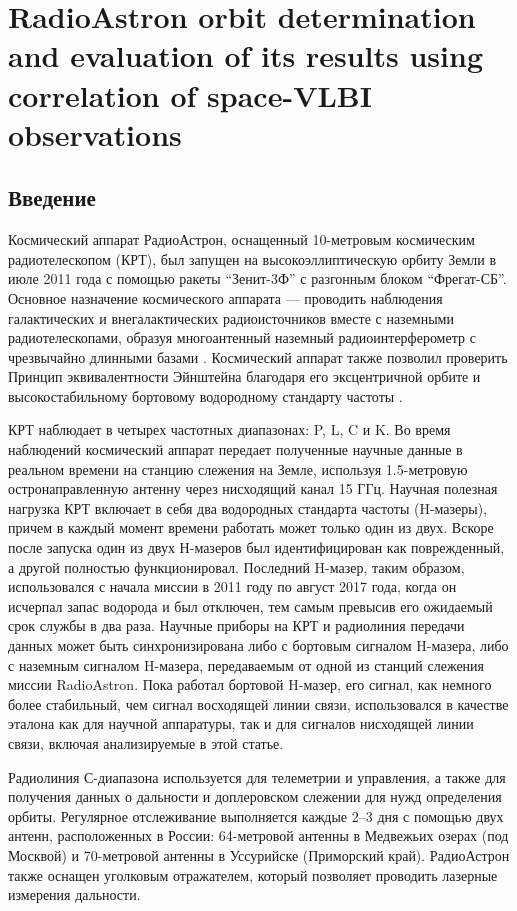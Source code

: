 \section{RadioAstron orbit determination and evaluation of its results using correlation of
space-VLBI observations}

\subsection{Введение}

Космический аппарат РадиоАстрон, оснащенный 10-метровым космическим радиотелескопом (КРТ), был
запущен на высокоэллиптическую орбиту Земли в июле 2011 года с помощью ракеты ``Зенит-3Ф'' с
разгонным блоком ``Фрегат-СБ''. Основное назначение космического аппарата --- проводить наблюдения
галактических и внегалактических радиоисточников вместе с наземными радиотелескопами, образуя
многоантенный наземный радиоинтерферометр с чрезвычайно длинными базами \cite{Kardashev_2013_rus}.
Космический аппарат также позволил проверить Принцип эквивалентности Эйнштейна благодаря его
эксцентричной орбите и высокостабильному бортовому водородному стандарту частоты
\cite{Litvinov_2018,Nunes_2020}.

КРТ наблюдает в четырех частотных диапазонах: P, L, C и K. Во время наблюдений космический аппарат
передает полученные научные данные в реальном времени на станцию слежения на Земле, используя
1.5-метровую остронаправленную антенну через нисходящий канал 15 ГГц. Научная полезная нагрузка КРТ
включает в себя два водородных стандарта частоты (H-мазеры), причем в каждый момент времени работать
может только один из двух. Вскоре после запуска один из двух Н-мазеров был идентифицирован как
поврежденный, а другой полностью функционировал. Последний H-мазер, таким образом, использовался с
начала миссии в 2011 году по август 2017 года, когда он исчерпал запас водорода и был отключен, тем
самым превысив его ожидаемый срок службы в два раза. Научные приборы на КРТ и радиолиния передачи
данных может быть синхронизирована либо с бортовым сигналом H-мазера, либо с наземным сигналом
H-мазера, передаваемым от одной из станций слежения миссии RadioAstron. Пока работал бортовой
H-мазер, его сигнал, как немного более стабильный, чем сигнал восходящей линии связи, использовался
в качестве эталона как для научной аппаратуры, так и для сигналов нисходящей линии связи, включая
анализируемые в этой статье.

Радиолиния С-диапазона используется для телеметрии и управления, а также для получения данных о
дальности и доплеровском слежении для нужд определения орбиты. Регулярное отслеживание выполняется
каждые 2--3 дня с помощью двух антенн, расположенных в России: 64-метровой антенны в Медвежьих
озерах (под Москвой) и 70-метровой антенны в Уссурийске (Приморский край). РадиоАстрон также оснащен
уголковым отражателем, который позволяет проводить лазерные измерения дальности.

